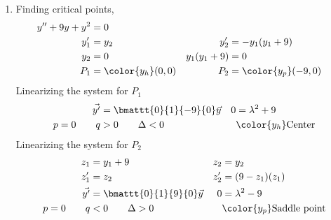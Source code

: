 \begin{enumerate}
    \item Finding critical points,
          \begin{align}
              y'' + 9y + y^{2} & = 0                     \\
              y_1'             & = y_2                 &
              y_2'             & = -y_1(y_1 + 9)         \\
              y_2              & = 0                   &
              y_1(y_1 + 9)     & = 0                     \\
              P_1              & = \color{y_h}(0, 0)   &
              P_2              & = \color{y_p} (-9, 0)   \\
          \end{align}
          Linearizing the system for $ P_1 $
          \begin{align}
              \vec{y'}       & = \bmattt{0}{1}{-9}{0} \vec{y} &
              0              & = \lambda^{2} + 9                \\
              p = 0 \qquad q & > 0 \qquad \Delta < 0          &
                             & \color{y_h} \text{Center}
          \end{align}
          Linearizing the system for $ P_2 $
          \begin{align}
              z_1            & = y_1 + 9                       &
              z_2            & = y_2                             \\
              z_1'           & = z_2                           &
              z_2'           & = (9 - z_1)(z_1)                  \\
              \vec{y'}       & = \bmattt{0}{1}{9}{0} \vec{y}   &
              0              & = \lambda^{2} - 9                 \\
              p = 0 \qquad q & < 0 \qquad \Delta > 0           &
                             & \color{y_p} \text{Saddle point}
          \end{align}


\end{enumerate}

